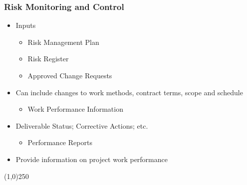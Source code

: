 \begin{frame}
\frametitle{Risk Monitoring and Control}
\begin{itemize}
\item Inputs
\begin{itemize}
	\item Risk Management Plan
\item Risk Register
\item Approved Change Requests
\end{itemize}
\item Can include changes to work methods, contract terms, scope and schedule
\begin{itemize}
	\item Work Performance Information
\end{itemize}
\item Deliverable Status; Corrective Actions; etc.
\begin{itemize}
	\item Performance Reports
\end{itemize}
\item Provide information on project work performance
\end{itemize}
\end{frame}\begin{center}\line(1,0){250}\end{center}



